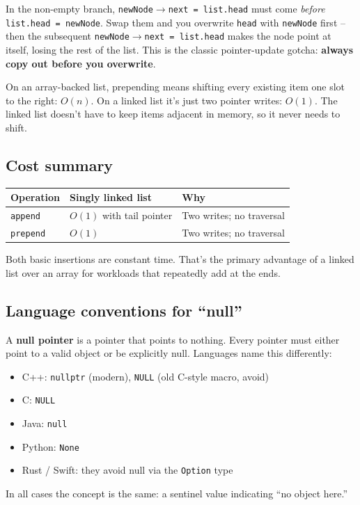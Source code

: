 \documentclass[11pt]{article}
\begin{document}
\begin{ideabox}
In the non-empty branch, \texttt{newNode$\to$next = list.head} must
come \emph{before} \texttt{list.head = newNode}. Swap them and you
overwrite \texttt{head} with \texttt{newNode} first -- then the
subsequent \texttt{newNode$\to$next = list.head} makes the node
point at itself, losing the rest of the list. This is the classic
pointer-update gotcha: \textbf{always copy out before you overwrite}.
\end{ideabox}

\begin{notebox}
On an array-backed list, prepending means shifting every existing
item one slot to the right: $O(n)$. On a linked list it's just two
pointer writes: $O(1)$. The linked list doesn't have to keep items
adjacent in memory, so it never needs to shift.
\end{notebox}

\subsection{Cost summary}

\begin{center}
\footnotesize
\renewcommand{\arraystretch}{1.3}
\begin{tabular}{@{}lll@{}}
\hline
\textbf{Operation}    & \textbf{Singly linked list} & \textbf{Why} \\
\hline
\texttt{append}       & $O(1)$ with tail pointer    & Two writes; no traversal \\
\texttt{prepend}      & $O(1)$                      & Two writes; no traversal \\
\hline
\end{tabular}
\end{center}

Both basic insertions are constant time. That's the primary
advantage of a linked list over an array for workloads that
repeatedly add at the ends.

\subsection{Language conventions for ``null''}

\begin{defnbox}[Null]
A \textbf{null pointer} is a pointer that points to nothing. Every
pointer must either point to a valid object or be explicitly null.
Languages name this differently:
\begin{itemize}[leftmargin=*]
  \item C++: \texttt{nullptr} (modern), \texttt{NULL} (old C-style macro, avoid)
  \item C: \texttt{NULL}
  \item Java: \texttt{null}
  \item Python: \texttt{None}
  \item Rust / Swift: they avoid null via the \texttt{Option} type
\end{itemize}
In all cases the concept is the same: a sentinel value indicating
``no object here.''
\end{defnbox}
\end{document}
